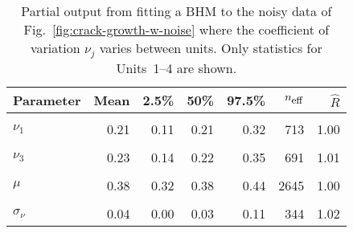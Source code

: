\begin{table}
\centering
\caption{\label{tab:pp_nu}Partial output from fitting a BHM to the noisy data of Fig.~\ref{fig:crack-growth-w-noise} where the coefficient of variation $\nu_j$ varies between units. Only statistics for Units~1--4 are shown.}
\centering
\begin{tabular}[t]{lrrrrrr}
\toprule
Parameter & Mean & 2.5\% & 50\% & 97.5\% & $n_{\small{\mbox{eff}}}$ & $\hat{R}$\\
\midrule
\cellcolor{gray!10}{$\sigma$} & \cellcolor{gray!10}{0.03} & \cellcolor{gray!10}{0.02} & \cellcolor{gray!10}{0.03} & \cellcolor{gray!10}{0.04} & \cellcolor{gray!10}{1959} & \cellcolor{gray!10}{1.00}\\
$\nu_1$ & 0.21 & 0.11 & 0.21 & 0.32 & 713 & 1.00\\
\cellcolor{gray!10}{$\nu_2$} & \cellcolor{gray!10}{0.23} & \cellcolor{gray!10}{0.14} & \cellcolor{gray!10}{0.22} & \cellcolor{gray!10}{0.34} & \cellcolor{gray!10}{784} & \cellcolor{gray!10}{1.01}\\
$\nu_3$ & 0.23 & 0.14 & 0.22 & 0.35 & 691 & 1.01\\
\cellcolor{gray!10}{$\nu_4$} & \cellcolor{gray!10}{0.23} & \cellcolor{gray!10}{0.13} & \cellcolor{gray!10}{0.22} & \cellcolor{gray!10}{0.35} & \cellcolor{gray!10}{729} & \cellcolor{gray!10}{1.01}\\
\addlinespace
$\mu$ & 0.38 & 0.32 & 0.38 & 0.44 & 2645 & 1.00\\
\cellcolor{gray!10}{$\mu_\nu$} & \cellcolor{gray!10}{0.22} & \cellcolor{gray!10}{0.15} & \cellcolor{gray!10}{0.22} & \cellcolor{gray!10}{0.31} & \cellcolor{gray!10}{506} & \cellcolor{gray!10}{1.01}\\
$\sigma_\nu$ & 0.04 & 0.00 & 0.03 & 0.11 & 344 & 1.02\\
\bottomrule
\end{tabular}
\end{table}

